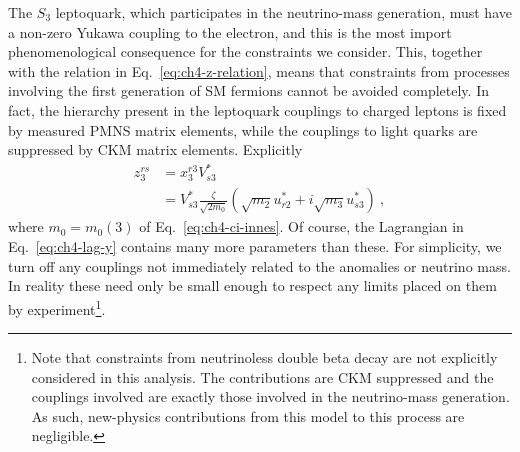 The $S_{3}$ leptoquark, which participates in the neutrino-mass generation, must
have a non-zero Yukawa coupling to the electron, and this is the most import
phenomenological consequence for the constraints we consider. This, together
with the relation in Eq.~\eqref{eq:ch4-z-relation}, means that constraints from
processes involving the first generation of SM fermions cannot be avoided
completely. In fact, the hierarchy present in the leptoquark couplings to
charged leptons is fixed by measured PMNS matrix elements, while the couplings
to light quarks are suppressed by CKM matrix elements. Explicitly
\begin{equation}
   \label{eq:ch4-yxckm}
  \begin{split}
    z_{3}^{rs} &= x_{3}^{r3} V_{s3}^* \\
    &= V_{s3}^* \frac{\zeta}{\sqrt{2m_0}} \left( \sqrt{m_2} u_{r2}^* + i \sqrt{m_3} u_{s3}^* \right) \ ,
  \end{split}
\end{equation}
where $m_{0} = m_{0}(3)$ of Eq.~\eqref{eq:ch4-ci-innes}. Of course, the
Lagrangian in Eq.~\eqref{eq:ch4-lag-y} contains many more parameters than these.
For simplicity, we turn off any couplings not immediately related to the
anomalies or neutrino mass. In reality these need only be small enough to
respect any limits placed on them by experiment\footnote{Note that constraints
  from neutrinoless double beta decay are not explicitly considered in this
  analysis. The contributions are CKM suppressed and the couplings involved are
  exactly those involved in the neutrino-mass generation. As such, new-physics
  contributions from this model to this process are negligible.}.

